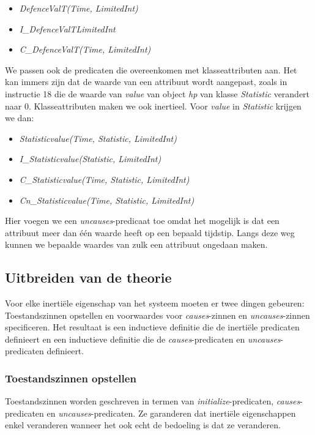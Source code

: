 \begin{itemize}
	\item \textit{DefenceValT(Time, LimitedInt)}
	\item \textit{I\_DefenceValT{LimitedInt}}
	\item \textit{C\_DefenceValT(Time, LimitedInt)}
\end{itemize}

We passen ook de predicaten die overeenkomen met klasseattributen aan. Het kan immers zijn dat de waarde van een attribuut wordt aangepast, zoals in instructie 18 die de waarde van \textit{value} van object \textit{hp} van klasse \textit{Statistic} verandert naar 0. Klasseattributen maken we ook inertieel. Voor \textit{value} in \textit{Statistic} krijgen we dan:

\begin{itemize}
	\item \textit{Statisticvalue(Time, Statistic, LimitedInt)}
	\item \textit{I\_Statisticvalue(Statistic, LimitedInt)}
	\item \textit{C\_Statisticvalue(Time, Statistic, LimitedInt)}
	\item \textit{Cn\_Statisticvalue(Time, Statistic, LimitedInt)}
\end{itemize}

Hier voegen we een \textit{uncauses}-predicaat toe omdat het mogelijk is dat een attribuut meer dan \'e\'en waarde heeft op een bepaald tijdstip. Langs deze weg kunnen we bepaalde waardes van zulk een attribuut ongedaan maken.

\subsection{Uitbreiden van de theorie}
Voor elke inerti\"ele eigenschap van het systeem moeten er twee dingen gebeuren: Toestandszinnen opstellen en voorwaardes voor \textit{causes}-zinnen en \textit{uncauses}-zinnen specificeren. Het resultaat is een inductieve definitie die de inerti\"ele predicaten definieert en een inductieve definitie die de \textit{causes}-predicaten en \textit{uncauses}-predicaten definieert.

\subsubsection{Toestandszinnen opstellen}
Toestandszinnen worden geschreven in termen van \textit{initialize}-predicaten, \textit{causes}-predicaten en \textit{uncauses}-predicaten. Ze garanderen dat inerti\"ele eigenschappen enkel veranderen wanneer het ook echt de bedoeling is dat ze veranderen.

